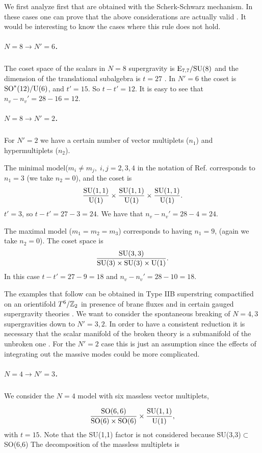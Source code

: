 \documentclass[a4paper,12pt]{article}
\begin{document}
We first analyze first  that are obtained with the
Scherk-Schwarz mechanism. In  these cases one can prove that the
above considerations are actually valid \cite{adfl1}. It
would be interesting to know the cases where this rule does not
hold.

\subparagraph{$N=8\rightarrow N'=6$.} The coset space of the
scalars in  $N=8$ supergravity is $\mathrm{E}_{7,7}/\mathrm{SU}(8)$ and the
dimension of the translational subalgebra is $t=27$ \cite{adfft}.
In $N'=6$ the coset is $\mathrm{SO}^*(12)/\mathrm{U}(6)$, and $t'=15$. So
$t-t'=12$. It is easy to see that $n_v-n_v'=28-16=12$.


\subparagraph{$N=8\rightarrow N'=2$.} For $N'=2$ we  have a
certain number of vector multiplets  ($n_1$) and hypermultiplets
($n_2$).

The minimal model($m_i\neq m_j,\; i,j= 2,3,4$ in the notation of
Ref. \cite{ss,css} corresponds to  $n_1=3$ (we take $n_2=0$),
and  the coset is
$$\frac{\mathrm{SU}(1,1)}{\mathrm{U}(1)}\times\frac{\mathrm{SU}(1,1)}{\mathrm{U}(1)}\times\frac{\mathrm{SU}(1,1)}{\mathrm{U}(1)}.
$$$t'=3$, so $t-t'=27-3=24$. We have that  $n_v-n_v'=28-4=24$.

The maximal model ($m_1= m_2=m_3$) corresponds to having $n_1=9$, (again we take $n_2=0$). The coset space is
$$\frac{\mathrm{SU}(3,3)}{\mathrm{SU}(3)\times\mathrm{SU}(3)\times\mathrm{U}(1)}.$$ In this case $t-t'=27-9=18$ and $n_v-n_v'=28-10=18$.



\bigskip

The examples that follow can be obtained  in Type IIB superstring
 compactified on an orientifold $T^6/\mathbb{Z}_2$ in presence of brane fluxes  \cite{fp,kst} and in certain
  gauged supergravity theories \cite{tz,dfv}.
We  want to consider the spontaneous breaking of $N=4,3$
supergravities down to $N'=3,2$. In order to have a consistent
reduction it is necessary that  the scalar manifold of
 the broken theory is a submanifold of the unbroken one \cite{adf}. For the $N'=2$ case this is just
 an assumption since the effects of integrating out the massive modes could be more complicated.








\subparagraph{$N=4\rightarrow N'=3$.} We consider the $N=4$ model with six massless vector multiplets,

$$\frac{\mathrm{SO}(6,6)}{\mathrm{SO}(6)\times\mathrm{SO}(6)}\times
\frac{\mathrm{SU}(1,1)}{\mathrm{U}(1)}, $$ with $t=15$. Note that the SU(1,1)
factor is not considered because SU(3,3)$\subset$SO(6,6) The
decomposition of the massless multiplets is
\end{document}
